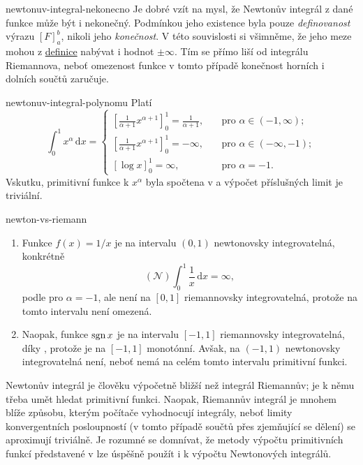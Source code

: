\begin{warning}{}{newtonuv-integral-nekonecno}
 Je dobré vzít na mysl, že Newtonův integrál z dané funkce může být i nekonečný.
 Podmínkou jeho existence byla pouze \emph{definovanost} výrazu $[F]_a^{b}$,
 nikoli jeho \emph{konečnost}. V této souvislosti si všimněme, že jeho meze
 mohou z \hyperref[def:newtonuv-integral]{definice} nabývat i hodnot $ \pm
 \infty$. Tím se přímo liší od integrálu Riemannova, neboť omezenost funkce v
 tomto případě konečnost horních i dolních součtů zaručuje.
\end{warning}

\begin{example}{}{newtonuv-integral-polynomu}
 Platí
 \[
  \int_{0}^{1} x^{\alpha} \, \mathrm{d}x = \begin{cases}
   \left[ \frac{1}{\alpha+1}x^{\alpha+1} \right]_0^{1} = \frac{1}{\alpha+1},
   & \quad \text{pro } \alpha \in (-1,\infty); \\
   \left[ \frac{1}{\alpha+1}x^{\alpha+1} \right]_0^{1} = -\infty, & \quad
   \text{pro } \alpha \in (-\infty,-1); \\
   [\log x]_0^{1} = \infty,& \quad \text{pro } \alpha = -1.
  \end{cases}
 \]
 Vskutku, primitivní funkce k $x^{\alpha}$ byla spočtena v
  a výpočet příslušných limit je
 triviální.
\end{example}

\begin{example}{}{newton-vs-riemann}
 \begin{enumerate}
  \item Funkce $f(x) = 1 / x$ je na intervalu $(0,1)$ newtonovsky
   integrovatelná, konkrétně
   \[
    (\mathcal{N}) \int_{0}^{1} \frac{1}{x} \, \mathrm{d}x = \infty,
   \]
   podle  pro $\alpha = -1$,
   ale není na $[0,1]$ riemannovsky integrovatelná, protože na tomto intervalu
   není omezená.
  \item Naopak, funkce $\operatorname{sgn} x$ je na intervalu $[-1,1]$ riemannovsky
   integrovatelná, díky ,
   protože je na $[-1,1]$ monotónní. Avšak, na $(-1,1)$ newtonovsky
   integrovatelná není, neboť nemá na celém tomto intervalu primitivní funkci.
 \end{enumerate}
\end{example}

Newtonův integrál je člověku výpočetně bližší než integrál Riemannův; je k němu
třeba umět hledat primitivní funkci. Naopak, Riemannův integrál je mnohem blíže
způsobu, kterým počítače vyhodnocují integrály, neboť limity konvergentních
posloupností (v tomto případě součtů přes zjemňující se dělení) se aproximují
triviálně. Je rozumné se domnívat, že metody výpočtu primitivních funkcí
představené v  lze úspěšně použít
i k výpočtu Newtonových integrálů.


